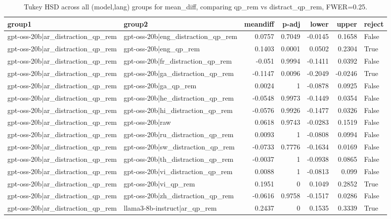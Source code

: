 \begin{table}
\caption{Tukey HSD across all (model,lang) groups for mean_diff, comparing qp_rem vs distract_qp_rem, FWER=0.25.}
\label{tab:tukey_all_models_all_langs_mean_diff_qp_rem_vs_distract_qp_rem}
\begin{tabular}{l l r r r r l}
\toprule
group1 & group2 & meandiff & p-adj & lower & upper & reject \\
\midrule
gpt-oss-20b|ar_distraction_qp_rem & gpt-oss-20b|eng_distraction_qp_rem & 0.0757 & 0.7049 & -0.0145 & 0.1658 & False \\
gpt-oss-20b|ar_distraction_qp_rem & gpt-oss-20b|eng_qp_rem & 0.1403 & 0.0001 & 0.0502 & 0.2304 & True \\
gpt-oss-20b|ar_distraction_qp_rem & gpt-oss-20b|fr_distraction_qp_rem & -0.051 & 0.9994 & -0.1411 & 0.0392 & False \\
gpt-oss-20b|ar_distraction_qp_rem & gpt-oss-20b|ga_distraction_qp_rem & -0.1147 & 0.0096 & -0.2049 & -0.0246 & True \\
gpt-oss-20b|ar_distraction_qp_rem & gpt-oss-20b|ga_qp_rem & 0.0024 & 1 & -0.0878 & 0.0925 & False \\
gpt-oss-20b|ar_distraction_qp_rem & gpt-oss-20b|he_distraction_qp_rem & -0.0548 & 0.9973 & -0.1449 & 0.0354 & False \\
gpt-oss-20b|ar_distraction_qp_rem & gpt-oss-20b|hi_distraction_qp_rem & -0.0576 & 0.9926 & -0.1477 & 0.0326 & False \\
gpt-oss-20b|ar_distraction_qp_rem & gpt-oss-20b|raw & 0.0618 & 0.9743 & -0.0283 & 0.1519 & False \\
gpt-oss-20b|ar_distraction_qp_rem & gpt-oss-20b|ru_distraction_qp_rem & 0.0093 & 1 & -0.0808 & 0.0994 & False \\
gpt-oss-20b|ar_distraction_qp_rem & gpt-oss-20b|sw_distraction_qp_rem & -0.0733 & 0.7776 & -0.1634 & 0.0169 & False \\
gpt-oss-20b|ar_distraction_qp_rem & gpt-oss-20b|th_distraction_qp_rem & -0.0037 & 1 & -0.0938 & 0.0865 & False \\
gpt-oss-20b|ar_distraction_qp_rem & gpt-oss-20b|vi_distraction_qp_rem & 0.0088 & 1 & -0.0813 & 0.099 & False \\
gpt-oss-20b|ar_distraction_qp_rem & gpt-oss-20b|vi_qp_rem & 0.1951 & 0 & 0.1049 & 0.2852 & True \\
gpt-oss-20b|ar_distraction_qp_rem & gpt-oss-20b|zh_distraction_qp_rem & -0.0616 & 0.9758 & -0.1517 & 0.0286 & False \\
gpt-oss-20b|ar_distraction_qp_rem & llama3-8b-instruct|ar_qp_rem & 0.2437 & 0 & 0.1535 & 0.3339 & True \\

\end{tabular}
\end{table}
